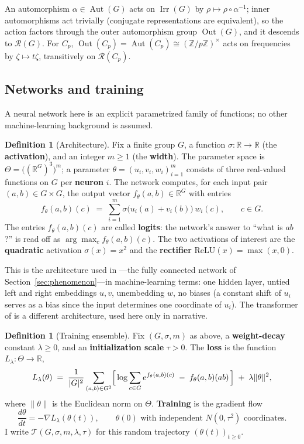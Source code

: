\documentclass[11pt]{amsart}
\theoremstyle{plain}
\theoremstyle{definition}
\newtheorem{definition}[theorem]{Definition}
\DeclareMathOperator{\Irr}{Irr}
\DeclareMathOperator{\Out}{Out}
\DeclareMathOperator{\Aut}{Aut}
\newcommand{\R}{\mathbb{R}}
\newcommand{\Z}{\mathbb{Z}}
\newcommand{\Rcl}{\mathcal{R}}
\begin{document}
An automorphism $\alpha \in \Aut(G)$ acts on $\Irr(G)$ by $\rho \mapsto \rho \circ \alpha^{-1}$; inner automorphisms act trivially (conjugate representations are equivalent), so the action factors through the outer automorphism group $\Out(G)$, and it descends to $\Rcl(G)$. For $C_p$, $\Out(C_p) = \Aut(C_p) \cong (\Z/p\Z)^\times$ acts on frequencies by $\zeta \mapsto t\zeta$, transitively on $\Rcl(C_p)$.

\subsection{Networks and training}\label{sec:networks}
A neural network here is an explicit parametrized family of functions; no other machine-learning background is assumed.

\begin{definition}[Architecture]\label{def:arch}
Fix a finite group $G$, a function $\sigma \colon \R \to \R$ (the \textbf{activation}), and an integer $m \geq 1$ (the \textbf{width}). The parameter space is $\Theta = \bigl((\R^G)^3\bigr)^m$; a parameter $\theta = (u_i, v_i, w_i)_{i=1}^m$ consists of three real-valued functions on $G$ per \textbf{neuron} $i$. The network computes, for each input pair $(a,b) \in G \times G$, the output vector $f_\theta(a,b) \in \R^G$ with entries
\[
   f_\theta(a,b)(c) \;=\; \sum_{i=1}^m \sigma\bigl(u_i(a) + v_i(b)\bigr)\, w_i(c), \qquad c \in G.
\]
The entries $f_\theta(a,b)(c)$ are called \textbf{logits}: the network's answer to ``what is $ab$?'' is read off as $\arg\max_c f_\theta(a,b)(c)$. The two activations of interest are the \textbf{quadratic} activation $\sigma(x) = x^2$ and the \textbf{rectifier} $\mathrm{ReLU}(x) = \max(x,0)$.
\end{definition}

This is the architecture used in \cite{chughtai2023,morwani2024}---the fully connected network of Section~\ref{sec:phenomenon}---in machine-learning terms: one hidden layer, untied left and right embeddings $u, v$, unembedding $w$, no biases (a constant shift of $u_i$ serves as a bias since the input determines one coordinate of $u_i$). The transformer of \cite{nanda2023} is a different architecture, used here only in narrative.

\begin{definition}[Training ensemble]\label{def:ensemble}
Fix $(G, \sigma, m)$ as above, a \textbf{weight-decay} constant $\lambda \geq 0$, and an \textbf{initialization scale} $\tau > 0$. The \textbf{loss} is the function $L_\lambda \colon \Theta \to \R$,
\[
   L_\lambda(\theta) \;=\; \frac{1}{|G|^2} \sum_{(a,b) \in G^2}
   \Bigl[\, \log \sum_{c \in G} e^{f_\theta(a,b)(c)} \;-\; f_\theta(a,b)(ab) \,\Bigr]
   \;+\; \lambda \|\theta\|^2,
\]
where $\|\theta\|$ is the Euclidean norm on $\Theta$. \textbf{Training} is the gradient flow
\[
   \frac{d\theta}{dt} = -\nabla L_\lambda(\theta(t)), \qquad
   \theta(0) \text{ with independent } N(0, \tau^2) \text{ coordinates}.
\]
I write $\mathcal{T}(G, \sigma, m, \lambda, \tau)$ for this random trajectory $(\theta(t))_{t \geq 0}$.
\end{definition}
\end{document}
